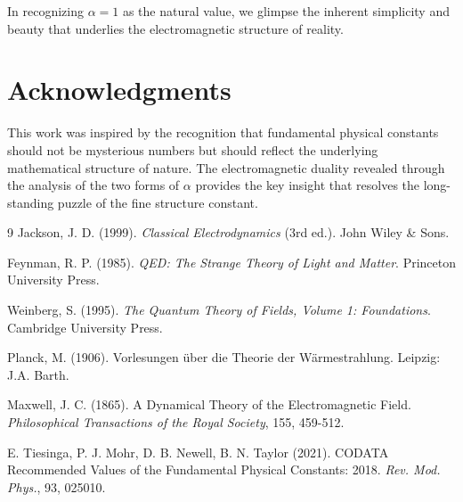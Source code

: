 In recognizing $\alpha = 1$ as the natural value, we glimpse the inherent simplicity and beauty that underlies the electromagnetic structure of reality.
	
	\section{Acknowledgments}
	
	This work was inspired by the recognition that fundamental physical constants should not be mysterious numbers but should reflect the underlying mathematical structure of nature. The electromagnetic duality revealed through the analysis of the two forms of $\alpha$ provides the key insight that resolves the long-standing puzzle of the fine structure constant.
	
	\begin{thebibliography}{9}
		 Jackson, J. D. (1999). \textit{Classical Electrodynamics} (3rd ed.). John Wiley \& Sons.
		
		 Feynman, R. P. (1985). \textit{QED: The Strange Theory of Light and Matter}. Princeton University Press.
		
		 Weinberg, S. (1995). \textit{The Quantum Theory of Fields, Volume 1: Foundations}. Cambridge University Press.
		
		 Planck, M. (1906). Vorlesungen über die Theorie der Wärmestrahlung. Leipzig: J.A. Barth.
		
		 Maxwell, J. C. (1865). A Dynamical Theory of the Electromagnetic Field. \textit{Philosophical Transactions of the Royal Society}, 155, 459-512.
		
		 E. Tiesinga, P. J. Mohr, D. B. Newell, B. N. Taylor (2021). CODATA Recommended Values of the Fundamental Physical Constants: 2018. \textit{Rev. Mod. Phys.}, 93, 025010.
	\end{thebibliography}
